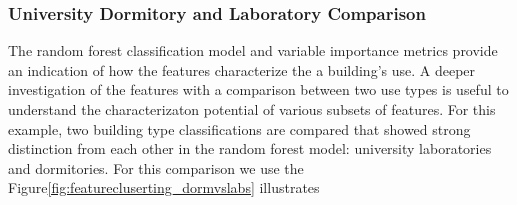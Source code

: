 \subsubsection{University Dormitory and Laboratory Comparison}
\label{sec:dormvslab}

The random forest classification model and variable importance metrics provide an indication of how the features characterize the a building's use. A deeper investigation of the features with a comparison between two use types is useful to understand the characterizaton potential of various subsets of features. For this example, two building type classifications are compared that showed strong distinction from each other in the random forest model: university laboratories and dormitories. For this comparison we use the Figure\ref{fig:featurecluserting_dormvslabs} illustrates